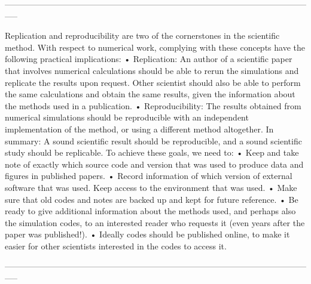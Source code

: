 -----------------------------------------------------------------------------------------------------------------

Replication and reproducibility are two of the cornerstones in the scientific method. With respect to numerical work, complying with these concepts have the following practical implications:
• Replication: An author of a scientific paper that involves numerical calculations should be able to
rerun the simulations and replicate the results upon request. Other scientist should also be able to
perform the same calculations and obtain the same results, given the information about the methods
used in a publication.
• Reproducibility: The results obtained from numerical simulations should be reproducible with an
independent implementation of the method, or using a different method altogether.
In summary: A sound scientific result should be reproducible, and a sound scientific study should be
replicable.
To achieve these goals, we need to:
• Keep and take note of exactly which source code and version that was used to produce data and figures
in published papers.
• Record information of which version of external software that was used. Keep access to the environment
that was used.
• Make sure that old codes and notes are backed up and kept for future reference.
• Be ready to give additional information about the methods used, and perhaps also the simulation
codes, to an interested reader who requests it (even years after the paper was published!).
• Ideally codes should be published online, to make it easier for other scientists interested in the codes
to access it. \cite{johansson2014introduction}

-----------------------------------------------------------------------------------------------------------------